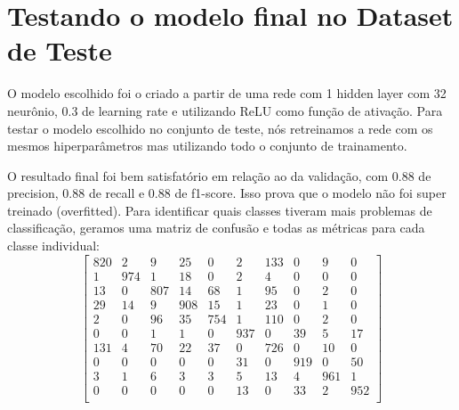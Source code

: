 \documentclass[conference]{IEEEtran}
\begin{document}
\section{Testando o modelo final no Dataset de Teste}

	O modelo escolhido foi o criado a partir de uma rede com 1 hidden layer com 32 neurônio, 0.3 de learning rate e utilizando ReLU como função de ativação.	Para testar o modelo escolhido no conjunto de teste, nós retreinamos a rede com os mesmos hiperparâmetros mas utilizando todo o conjunto de trainamento. 
	
	O resultado final foi bem satisfatório em relação ao da validação, com $0.88$ de precision, $0.88$ de recall e $0.88$ de f1-score. Isso prova que o modelo não foi super treinado (overfitted). Para identificar quais classes tiveram mais problemas de classificação, geramos uma matriz de confusão e todas as métricas para cada classe individual:
\[
\begin{bmatrix}
    820 & 2   & 9   & 25  & 0   & 2   & 133 & 0   & 9   & 0 \\
    1   & 974 & 1   & 18  & 0   & 2   & 4   & 0   & 0   & 0 \\
    13  & 0   & 807 & 14  & 68  & 1   & 95  & 0   & 2   & 0 \\
    29  & 14  & 9   & 908 & 15  & 1   & 23  & 0   & 1   & 0 \\
    2   & 0   & 96  & 35  & 754 & 1   & 110 & 0   & 2   & 0 \\
    0   & 0   & 1   & 1   & 0   & 937 &  0  & 39  & 5   & 17 \\
    131 & 4   & 70  & 22  & 37  & 0   & 726 & 0   & 10  & 0 \\
    0   & 0   & 0   & 0   & 0   & 31  & 0   & 919 & 0   & 50 \\
    3   & 1   & 6   & 3   & 3   & 5   & 13  & 4   & 961 & 1  \\
    0   & 0   & 0   & 0   & 0   & 13  & 0   & 33  & 2   & 952 \\
\end{bmatrix}
\]
\end{document}
